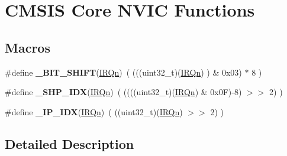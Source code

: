 \hypertarget{group___c_m_s_i_s___core___n_v_i_c_functions}{\section{C\-M\-S\-I\-S Core N\-V\-I\-C Functions}
\label{group___c_m_s_i_s___core___n_v_i_c_functions}
}
\subsection*{Macros}
\begin{DoxyCompactItemize}
\item 
\hypertarget{group___c_m_s_i_s___core___n_v_i_c_functions_ga53c75b28823441c6153269f0ecbed878}{\#define {\bfseries \-\_\-\-B\-I\-T\-\_\-\-S\-H\-I\-F\-T}(\hyperlink{group___configuration__section__for___c_m_s_i_s_ga666eb0caeb12ec0e281415592ae89083}{I\-R\-Qn})~(  (((uint32\-\_\-t)(\hyperlink{group___configuration__section__for___c_m_s_i_s_ga666eb0caeb12ec0e281415592ae89083}{I\-R\-Qn})       )    \&  0x03) $\ast$ 8 )}\label{group___c_m_s_i_s___core___n_v_i_c_functions_ga53c75b28823441c6153269f0ecbed878}

\item 
\hypertarget{group___c_m_s_i_s___core___n_v_i_c_functions_gaee4f7eb5d7e770ad51489dbceabb1755}{\#define {\bfseries \-\_\-\-S\-H\-P\-\_\-\-I\-D\-X}(\hyperlink{group___configuration__section__for___c_m_s_i_s_ga666eb0caeb12ec0e281415592ae89083}{I\-R\-Qn})~( ((((uint32\-\_\-t)(\hyperlink{group___configuration__section__for___c_m_s_i_s_ga666eb0caeb12ec0e281415592ae89083}{I\-R\-Qn}) \& 0x0\-F)-\/8) $>$$>$    2)     )}\label{group___c_m_s_i_s___core___n_v_i_c_functions_gaee4f7eb5d7e770ad51489dbceabb1755}

\item 
\hypertarget{group___c_m_s_i_s___core___n_v_i_c_functions_ga370ec4b1751a6a889d849747df3763a9}{\#define {\bfseries \-\_\-\-I\-P\-\_\-\-I\-D\-X}(\hyperlink{group___configuration__section__for___c_m_s_i_s_ga666eb0caeb12ec0e281415592ae89083}{I\-R\-Qn})~(   ((uint32\-\_\-t)(\hyperlink{group___configuration__section__for___c_m_s_i_s_ga666eb0caeb12ec0e281415592ae89083}{I\-R\-Qn})            $>$$>$    2)     )}\label{group___c_m_s_i_s___core___n_v_i_c_functions_ga370ec4b1751a6a889d849747df3763a9}

\end{DoxyCompactItemize}


\subsection{Detailed Description}
